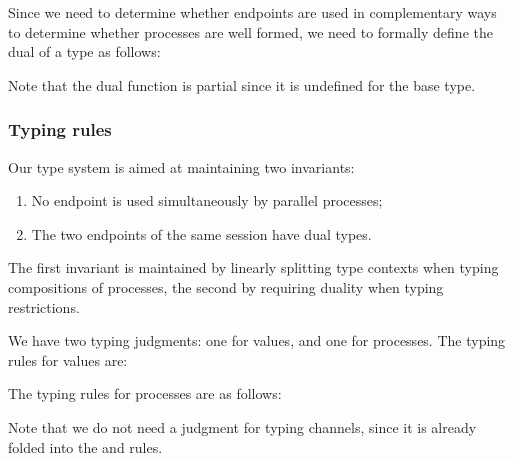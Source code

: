 Since we need to determine whether endpoints are used in complementary ways to determine whether processes are well formed, we need to formally define the dual of a type as follows:
Note that the dual function is partial since it is undefined for the base type.

\subsubsection{Typing rules}
Our type system is aimed at maintaining two invariants:
\begin{enumerate}
\item No endpoint is used simultaneously by parallel processes;
\item The two endpoints of the same session have dual types.
\end{enumerate}
The first invariant is maintained by linearly splitting type contexts when typing compositions of processes, the second by requiring duality when typing restrictions.

We have two typing judgments: one for values, and one for processes.
The typing rules for values are:
The typing rules for processes are as follows:
Note that we do not need a judgment for typing channels, since it is already folded into the  and  rules.

